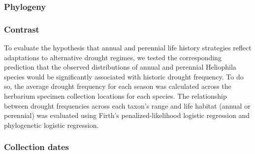 \documentclass[man,floatsintext]{apa6}
\theoremstyle{definition}
\theoremstyle{definition}
\theoremstyle{definition}
\theoremstyle{remark}
\begin{document}
\hypertarget{phylogeny}{%
\subsubsection{Phylogeny}\label{phylogeny}}

\hypertarget{contrast}{%
\subsubsection{Contrast}\label{contrast}}

To evaluate the hypothesis that annual and perennial life history
strategies reflect adaptations to alternative drought regimes, we tested
the corresponding prediction that the observed distributions of annual
and perennial Heliophila species would be significantly associated with
historic drought frequency. To do so, the average drought frequency for
each season was calculated across the herbarium specimen collection
locations for each species. The relationship between drought frequencies
across each taxon's range and life habitat (annual or perennial) was
evaluated using Firth's penalized-likelihood logistic regression and
phylogenetic logistic regression.

\hypertarget{collection-dates}{%
\subsubsection{Collection dates}\label{collection-dates}}
\end{document}
